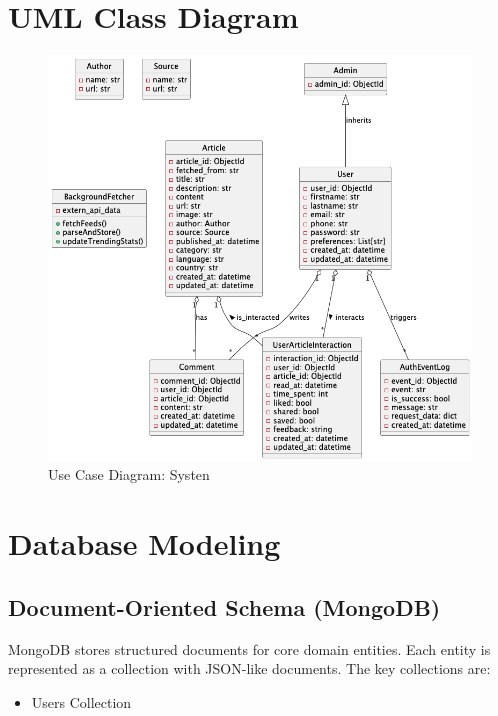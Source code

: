 \section{UML Class Diagram}\label{sec:uml-class-diagram}

\begin{figure}[!h]
    \centering
    \includegraphics[width=1\textwidth]{chapters/chapter_03/uml-class-diagram}
    \caption{Use Case Diagram: Systen}
    \label{fig:uml-class-diagram}
\end{figure}


\section{Database Modeling}\label{sec:database-modeling}

\subsection{Document-Oriented Schema (MongoDB)}\label{subsec:document-oriented-schema-mongodb}


MongoDB stores structured documents for core domain entities.
Each entity is represented as a collection with JSON-like documents.
The key collections are:

\begin{itemize}
    \item Users Collection
\end{itemize}

